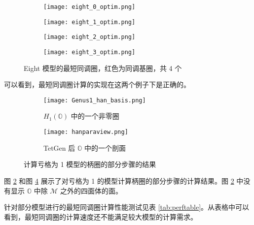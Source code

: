 \begin{figure}[h]
    \centering
    \begin{subfigure}{.2\textwidth}
        \centering
        \texttt{[image: eight\_0\_optim.png]}
    \end{subfigure}
    \begin{subfigure}{.2\textwidth}
        \centering
        \texttt{[image: eight\_1\_optim.png]}
    \end{subfigure}
    \begin{subfigure}{.2\textwidth}
        \centering
        \texttt{[image: eight\_2\_optim.png]}
    \end{subfigure}
    \begin{subfigure}{.2\textwidth}
        \centering
        \texttt{[image: eight\_3\_optim.png]}
    \end{subfigure}
    \caption{Eight 模型的最短同调圈，红色为同调基圈，共 4 个}
    \label{fig:eighthim}
\end{figure}

可以看到，最短同调圈计算的实现在这两个例子下是正确的。

\begin{figure}[h]
    \begin{subfigure}{.5\textwidth}
        \centering
        \texttt{[image: Genus1\_han\_basis.png]}
        \caption{$ H_1(\mathbb{O}) $ 中的一个非零圈}
        \label{fig:hanh1o}
    \end{subfigure}
    \begin{subfigure}{.5\textwidth}
        \centering
        \texttt{[image: hanparaview.png]}
        \caption{TetGen 后 $ \mathbb{O} $ 中的一个剖面}
        \label{fig:hanparaview}
    \end{subfigure}
    \caption{计算亏格为 1 模型的柄圈的部分步骤的结果}
\end{figure}

图 \ref{fig:hanh1o} 和图 \ref{fig:hanparaview} 展示了对亏格为 1 的模型计算柄圈的部分步骤的计算结果。图 \ref{fig:hanh1o} 中没有显示 $ \mathbb{O} $ 中除 $ \mathcal{M} $ 之外的四面体的面。

针对部分模型进行的最短同调圈计算性能测试见表 \ref{tab:perftable}。从表格中可以看到，最短同调圈的计算速度还不能满足较大模型的计算需求。

